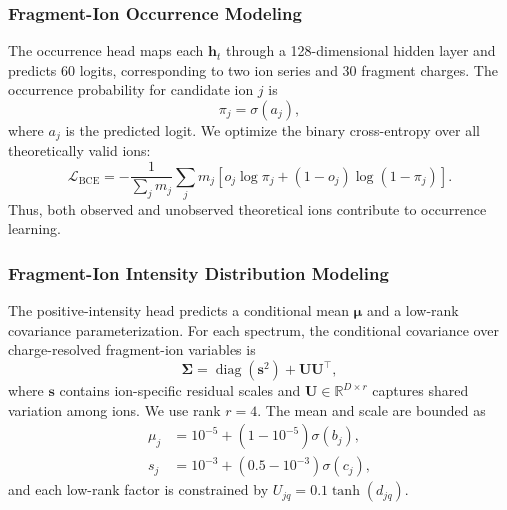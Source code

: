 \subsubsection{Fragment-Ion Occurrence Modeling}
\label{sec:occurrence_modeling}

The occurrence head maps each $\mathbf{h}_t$ through a 128-dimensional hidden
layer and predicts 60 logits, corresponding to two ion series and 30 fragment
charges. The occurrence probability for candidate ion $j$ is
\begin{equation}
    \pi_j = \sigma(a_j),
\end{equation}
where $a_j$ is the predicted logit. We optimize the binary cross-entropy over
all theoretically valid ions:
\begin{equation}
    \mathcal{L}_{\mathrm{BCE}}
    = -\frac{1}{\sum_j m_j}
    \sum_j m_j
    \left[o_j\log\pi_j+(1-o_j)\log(1-\pi_j)\right].
\end{equation}
Thus, both observed and unobserved theoretical ions contribute to occurrence
learning.

\subsubsection{Fragment-Ion Intensity Distribution Modeling}
\label{sec:intensity_distribution}

The positive-intensity head predicts a conditional mean $\boldsymbol{\mu}$
and a low-rank covariance parameterization. For each spectrum, the conditional
covariance over charge-resolved fragment-ion variables is
\begin{equation}
    \boldsymbol{\Sigma}
    = \operatorname{diag}(\mathbf{s}^{2})
      + \mathbf{U}\mathbf{U}^{\top},
    \label{eq:low_rank_covariance}
\end{equation}
where $\mathbf{s}$ contains ion-specific residual scales and
$\mathbf{U}\in\mathbb{R}^{D\times r}$ captures shared variation among ions.
We use rank $r=4$. The mean and scale are bounded as
\begin{align}
    \mu_j &= 10^{-5} + (1-10^{-5})\sigma(b_j),\\
    s_j &= 10^{-3} + (0.5-10^{-3})\sigma(c_j),
\end{align}
and each low-rank factor is constrained by
$U_{jq}=0.1\tanh(d_{jq})$.

